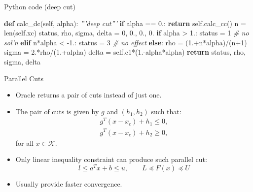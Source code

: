 \documentclass[10pt,ignorenonframetext,serif,onlymath]{beamer}
\newenvironment{Shaded}{}{}
\newcommand{\BuiltInTok}[1]{#1}
\newcommand{\CommentTok}[1]{\textcolor[rgb]{0.38,0.63,0.69}{\textit{#1}}}
\newcommand{\ControlFlowTok}[1]{\textcolor[rgb]{0.00,0.44,0.13}{\textbf{#1}}}
\newcommand{\DecValTok}[1]{\textcolor[rgb]{0.25,0.63,0.44}{#1}}
\newcommand{\FloatTok}[1]{\textcolor[rgb]{0.25,0.63,0.44}{#1}}
\newcommand{\KeywordTok}[1]{\textcolor[rgb]{0.00,0.44,0.13}{\textbf{#1}}}
\newcommand{\NormalTok}[1]{#1}
\newcommand{\OperatorTok}[1]{\textcolor[rgb]{0.40,0.40,0.40}{#1}}
\newcommand{\VariableTok}[1]{\textcolor[rgb]{0.10,0.09,0.49}{#1}}
\begin{document}
\begin{frame}[fragile]{Python code (deep cut)}
\protect\hypertarget{sec:python-code-deep-cut}{}

\begin{Shaded}
\begin{Highlighting}[]
    \KeywordTok{def}\NormalTok{ calc_dc(}\VariableTok{self}\NormalTok{, alpha):}
        \CommentTok{'''deep cut'''}
        \ControlFlowTok{if}\NormalTok{ alpha }\OperatorTok{==} \FloatTok{0.}\NormalTok{: }
            \ControlFlowTok{return} \VariableTok{self}\NormalTok{.calc_cc()}
\NormalTok{        n }\OperatorTok{=} \BuiltInTok{len}\NormalTok{(}\VariableTok{self}\NormalTok{.xc)}
\NormalTok{        status, rho, sigma, delta }\OperatorTok{=} \DecValTok{0}\NormalTok{, }\FloatTok{0.}\NormalTok{, }\FloatTok{0.}\NormalTok{, }\FloatTok{0.}
        \ControlFlowTok{if}\NormalTok{ alpha }\OperatorTok{>} \FloatTok{1.}\NormalTok{:}
\NormalTok{            status }\OperatorTok{=} \DecValTok{1}  \CommentTok{# no sol'n}
        \ControlFlowTok{elif}\NormalTok{ n}\OperatorTok{*}\NormalTok{alpha }\OperatorTok{<} \FloatTok{-1.}\NormalTok{:}
\NormalTok{            status }\OperatorTok{=} \DecValTok{3}  \CommentTok{# no effect}
        \ControlFlowTok{else}\NormalTok{:}
\NormalTok{            rho }\OperatorTok{=}\NormalTok{ (}\FloatTok{1.}\OperatorTok{+}\NormalTok{n}\OperatorTok{*}\NormalTok{alpha)}\OperatorTok{/}\NormalTok{(n}\OperatorTok{+}\DecValTok{1}\NormalTok{)}
\NormalTok{            sigma }\OperatorTok{=} \FloatTok{2.}\OperatorTok{*}\NormalTok{rho}\OperatorTok{/}\NormalTok{(}\FloatTok{1.}\OperatorTok{+}\NormalTok{alpha)}
\NormalTok{            delta }\OperatorTok{=} \VariableTok{self}\NormalTok{.c1}\OperatorTok{*}\NormalTok{(}\FloatTok{1.}\OperatorTok{-}\NormalTok{alpha}\OperatorTok{*}\NormalTok{alpha)}
        \ControlFlowTok{return}\NormalTok{ status, rho, sigma, delta}
\end{Highlighting}
\end{Shaded}

\end{frame}

\begin{frame}{Parallel Cuts}
\protect\hypertarget{sec:parallel-cuts}{}

\begin{itemize}
\item
  Oracle returns a pair of cuts instead of just one.
\item
  The pair of cuts is given by \(g\) and \((h_1, h_2)\) such that:
  \[\begin{array}{l}
  g^T (x - x_c) + h_1 \leq 0,  \\
  g^T (x - x_c) + h_2 \geq 0,
  \end{array}\] for all \(x \in \mathcal{K}\).
\item
  Only linear inequality constraint can produce such parallel cut:
  \[ l \leq a^T x + b \leq u, \qquad L \preceq F(x) \preceq U \]
\item
  Usually provide faster convergence.
\end{itemize}

\end{frame}
\end{document}
